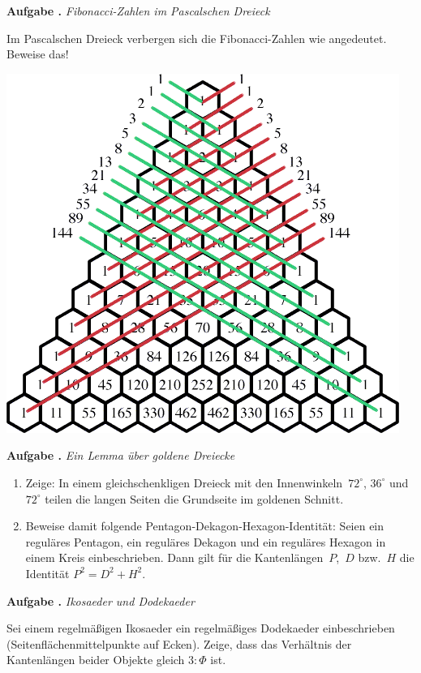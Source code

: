 \documentclass[a4paper,ngerman,twoside]{scrartcl}
\newlength{\aufgabenskip}
\newcounter{aufgabennummer}
\newenvironment{aufgabe}[1]{
  \addtocounter{aufgabennummer}{1}
  \textbf{Aufgabe \theaufgabennummer.} \emph{#1} \par
}{\vspace{\aufgabenskip}}
\begin{document}
\begin{aufgabe}{Fibonacci-Zahlen im Pascalschen Dreieck}
Im Pascalschen Dreieck verbergen sich die Fibonacci-Zahlen wie angedeutet.
Beweise das!
\begin{center}
\includegraphics[scale=0.3]{pascal-fibonacci}
\end{center}
\end{aufgabe}

\begin{aufgabe}{Ein Lemma über goldene Dreiecke}
\begin{enumerate}
\item Zeige: In einem gleichschenkligen Dreieck mit den
Innenwinkeln~$72^\circ$, $36^\circ$ und~$72^\circ$ teilen die langen Seiten die
Grundseite im goldenen Schnitt.
\item Beweise damit folgende Pentagon-Dekagon-Hexagon-Identität: Seien ein
reguläres Pentagon, ein reguläres Dekagon und ein reguläres Hexagon in einem
Kreis einbeschrieben. Dann gilt für die Kantenlängen~$P$,~$D$ bzw.~$H$ die
Identität $P^2 = D^2 + H^2$.
\end{enumerate}
\end{aufgabe}

\begin{aufgabe}{Ikosaeder und Dodekaeder}
Sei einem regelmäßigen Ikosaeder ein regelmäßiges Dodekaeder einbeschrieben
(Seitenflächenmittelpunkte auf Ecken). Zeige, dass das Verhältnis der Kantenlängen
beider Objekte gleich $3:\Phi$ ist.
\end{aufgabe}
\end{document}
